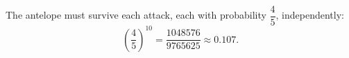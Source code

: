 The antelope must survive each attack, each with probability $\dfrac{4}{5}$, independently:
\[\left(\dfrac{4}{5}\right)^{10}=\boxed{\dfrac{1048576}{9765625}}\approx0.107.\]
